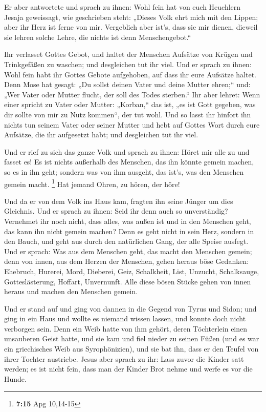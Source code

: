  Er aber antwortete und sprach zu ihnen: Wohl fein hat von
euch Heuchlern Jesaja geweissagt, wie geschrieben steht: „Dieses Volk
ehrt mich mit den Lippen; aber ihr Herz ist ferne von mir.
 Vergeblich aber ist's, dass sie mir dienen, dieweil sie
lehren solche Lehre, die nichts ist denn Menschengebot.``

 Ihr verlasset Gottes Gebot, und haltet der Menschen
Aufsätze von Krügen und Trinkgefäßen zu waschen; und desgleichen tut ihr
viel.  Und er sprach zu ihnen: Wohl fein habt ihr Gottes
Gebote aufgehoben, auf dass ihr eure Aufsätze haltet. 
Denn Mose hat gesagt: „Du sollst deinen Vater und deine Mutter ehren;``
und: „Wer Vater oder Mutter flucht, der soll des Todes sterben.``
 Ihr aber lehret: Wenn einer spricht zu Vater oder
Mutter: „Korban,`` das ist, „es ist Gott gegeben, was dir sollte von mir
zu Nutz kommen``, der tut wohl.  Und so lasst ihr hinfort
ihn nichts tun seinem Vater oder seiner Mutter  und hebt
auf Gottes Wort durch eure Aufsätze, die ihr aufgesetzt habt; und
desgleichen tut ihr viel.

 Und er rief zu sich das ganze Volk und sprach zu ihnen:
Höret mir alle zu und fasset es!  Es ist nichts außerhalb
des Menschen, das ihn könnte gemein machen, so es in ihn geht; sondern
was von ihm ausgeht, das ist's, was den Menschen gemein macht.
\footnote{\textbf{7:15} Apg 10,14-15}  Hat jemand Ohren,
zu hören, der höre!

 Und da er von dem Volk ins Haus kam, fragten ihn seine
Jünger um dies Gleichnis.  Und er sprach zu ihnen: Seid
ihr denn auch so unverständig? Vernehmet ihr noch nicht, dass alles, was
außen ist und in den Menschen geht, das kann ihn nicht gemein machen?
 Denn es geht nicht in sein Herz, sondern in den Bauch,
und geht aus durch den natürlichen Gang, der alle Speise ausfegt.
 Und er sprach: Was aus dem Menschen geht, das macht den
Menschen gemein;  denn von innen, aus dem Herzen der
Menschen, gehen heraus böse Gedanken: Ehebruch, Hurerei, Mord,
 Dieberei, Geiz, Schalkheit, List, Unzucht, Schalksauge,
Gotteslästerung, Hoffart, Unvernunft.  Alle diese bösen
Stücke gehen von innen heraus und machen den Menschen gemein.

 Und er stand auf und ging von dannen in die Gegend von
Tyrus und Sidon; und ging in ein Haus und wollte es niemand wissen
lassen, und konnte doch nicht verborgen sein.  Denn ein
Weib hatte von ihm gehört, deren Töchterlein einen unsauberen Geist
hatte, und sie kam und fiel nieder zu seinen Füßen  (und
es war ein griechisches Weib aus Syrophönizien), und sie bat ihn, dass
er den Teufel von ihrer Tochter austriebe.  Jesus aber
sprach zu ihr: Lass zuvor die Kinder satt werden; es ist nicht fein,
dass man der Kinder Brot nehme und werfe es vor die Hunde.

